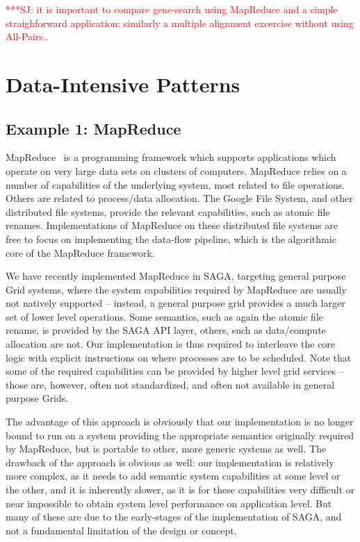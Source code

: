 \documentclass{rspublic}
\newcommand{\jhanote}[1]{ {\textcolor{red} { ***SJ: #1 }}}
\newcommand{\jhanote}[1]{}
\begin{document}
\jhanote{it is important to compare gene-search using MapReduce and a
  simple straighforward application; similarly a multiple
  alignment excercise without using All-Pairs..}

\section{Data-Intensive Patterns}

\subsection{Example 1: MapReduce}

MapReduce~\cite{mapreduce-paper} is a programming framework which
supports applications which operate on very large data sets on
clusters of computers.  MapReduce relies on a number of capabilities
of the underlying system, most related to file operations.  Others are 
related to process/data allocation.  The Google File System, and other
distributed file systems, provide the relevant capabilities, such as atomic
file renames.  Implementations of MapReduce on these distributed file systems
are free to focus on implementing the data-flow pipeline, which is the
algorithmic core of the MapReduce framework.

We have recently implemented MapReduce in SAGA, targeting general
purpose Grid systems, where the system capabilities required by
MapReduce are usually not natively supported -- instead, a general
purpose grid provides a much larger set of lower level operations.
Some semantics, such as again the atomic file rename, is provided by
the SAGA API layer, others, such as data/compute allocation are not.
Our implementation is thus required to interleave the core logic with
explicit instructions on where processes are to be scheduled.  Note that
some of the required capabilities can be provided by higher level grid
services -- those are, however, often not standardized, and often not
available in general purpose Grids.

The advantage of this approach is obviously that our implementation is
no longer bound to run on a system providing the appropriate semantics
originally required by MapReduce, but is portable to other, more
generic systems as well.  The drawback of the approach is obvious as
well: our implementation is relatively more complex, as it needs to
add semantic system capabilities at some level or the other, and it is
inherently slower, as it is for these capabilities very difficult or
near impossible to obtain system level performance on application
level.  But many of these are due to the early-stages of the
implementation of SAGA, and not a fundamental limitation of the design
or concept.
\end{document}
